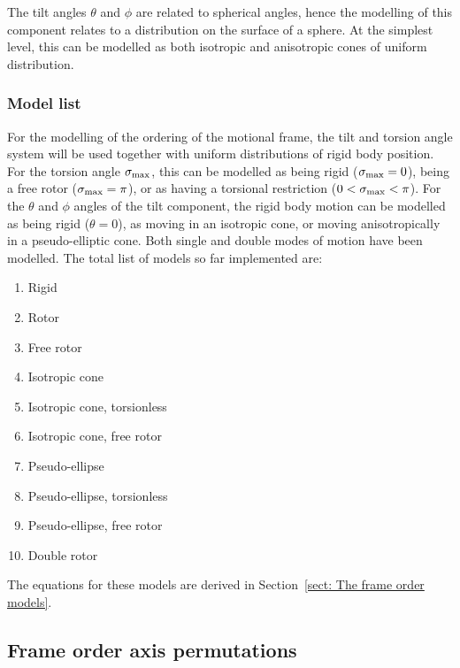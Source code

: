 The tilt angles $\theta$ and $\phi$ are related to spherical angles, hence the modelling of this component relates to a distribution on the surface of a sphere.
At the simplest level, this can be modelled as both isotropic and anisotropic cones of uniform distribution.





\subsubsection{Model list}

For the modelling of the ordering of the motional frame, the tilt and torsion angle system will be used together with uniform distributions of rigid body position.
For the torsion angle $\sigma_\textrm{max}$, this can be modelled as being rigid ($\sigma_\textrm{max} = 0$), being a free rotor ($\sigma_\textrm{max} = \pi$), or as having a torsional restriction ($0 < \sigma_\textrm{max} < \pi$).
For the $\theta$ and $\phi$ angles of the tilt component, the rigid body motion can be modelled as being rigid ($\theta = 0$), as moving in an isotropic cone, or moving anisotropically in a pseudo-elliptic cone.
Both single and double modes of motion have been modelled.
The total list of models so far implemented are:
\begin{enumerate}
    \item Rigid
    \item Rotor
    \item Free rotor
    \item Isotropic cone
    \item Isotropic cone, torsionless
    \item Isotropic cone, free rotor
    \item Pseudo-ellipse
    \item Pseudo-ellipse, torsionless
    \item Pseudo-ellipse, free rotor
    \item Double rotor
\end{enumerate}

The equations for these models are derived in Section~\ref{sect: The frame order models}.



\subsection{Frame order axis permutations}
\label{sect: axis permutations}

